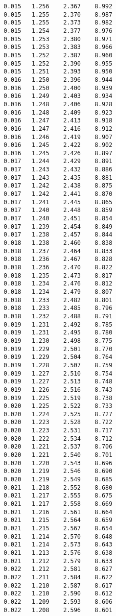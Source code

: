 \begin{verbatim}
   0.015   1.256    2.367    8.992
   0.015   1.255    2.370    8.987
   0.015   1.255    2.373    8.982
   0.015   1.254    2.377    8.976
   0.015   1.253    2.380    8.971
   0.015   1.253    2.383    8.966
   0.015   1.252    2.387    8.960
   0.015   1.252    2.390    8.955
   0.015   1.251    2.393    8.950
   0.016   1.250    2.396    8.944
   0.016   1.250    2.400    8.939
   0.016   1.249    2.403    8.934
   0.016   1.248    2.406    8.928
   0.016   1.248    2.409    8.923
   0.016   1.247    2.413    8.918
   0.016   1.247    2.416    8.912
   0.016   1.246    2.419    8.907
   0.016   1.245    2.422    8.902
   0.016   1.245    2.426    8.897
   0.017   1.244    2.429    8.891
   0.017   1.243    2.432    8.886
   0.017   1.243    2.435    8.881
   0.017   1.242    2.438    8.875
   0.017   1.242    2.441    8.870
   0.017   1.241    2.445    8.865
   0.017   1.240    2.448    8.859
   0.017   1.240    2.451    8.854
   0.017   1.239    2.454    8.849
   0.017   1.238    2.457    8.844
   0.018   1.238    2.460    8.838
   0.018   1.237    2.464    8.833
   0.018   1.236    2.467    8.828
   0.018   1.236    2.470    8.822
   0.018   1.235    2.473    8.817
   0.018   1.234    2.476    8.812
   0.018   1.234    2.479    8.807
   0.018   1.233    2.482    8.801
   0.018   1.233    2.485    8.796
   0.018   1.232    2.488    8.791
   0.019   1.231    2.492    8.785
   0.019   1.231    2.495    8.780
   0.019   1.230    2.498    8.775
   0.019   1.229    2.501    8.770
   0.019   1.229    2.504    8.764
   0.019   1.228    2.507    8.759
   0.019   1.227    2.510    8.754
   0.019   1.227    2.513    8.748
   0.019   1.226    2.516    8.743
   0.019   1.225    2.519    8.738
   0.020   1.225    2.522    8.733
   0.020   1.224    2.525    8.727
   0.020   1.223    2.528    8.722
   0.020   1.223    2.531    8.717
   0.020   1.222    2.534    8.712
   0.020   1.221    2.537    8.706
   0.020   1.221    2.540    8.701
   0.020   1.220    2.543    8.696
   0.020   1.219    2.546    8.690
   0.020   1.219    2.549    8.685
   0.021   1.218    2.552    8.680
   0.021   1.217    2.555    8.675
   0.021   1.217    2.558    8.669
   0.021   1.216    2.561    8.664
   0.021   1.215    2.564    8.659
   0.021   1.215    2.567    8.654
   0.021   1.214    2.570    8.648
   0.021   1.214    2.573    8.643
   0.021   1.213    2.576    8.638
   0.021   1.212    2.579    8.633
   0.022   1.212    2.581    8.627
   0.022   1.211    2.584    8.622
   0.022   1.210    2.587    8.617
   0.022   1.210    2.590    8.612
   0.022   1.209    2.593    8.606
   0.022   1.208    2.596    8.601

\end{verbatim}
